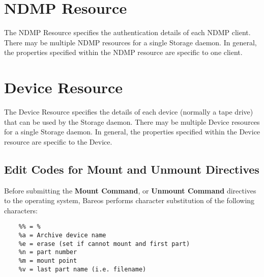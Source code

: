 \section{NDMP Resource}
\label{NDMPResource}
\label{StorageResourceNDMP}

The NDMP Resource specifies the authentication details of each NDMP client.
There may be multiple NDMP resources for a single Storage daemon. In general,
the properties specified within the NDMP resource are specific to one client.







\section{Device Resource}
\label{StorageResourceDevice}

The Device Resource specifies the details of each device (normally a tape
drive) that can be used by the Storage daemon.  There may be multiple
Device resources for a single Storage daemon.  In general, the properties
specified within the Device resource are specific to the Device.






\subsection{Edit Codes for Mount and Unmount Directives}
\label{mountcodes}

Before submitting the {\bf Mount Command}, or {\bf Unmount Command}
directives to the operating system, Bareos performs character substitution
of the following characters:

\footnotesize
\begin{verbatim}
    %% = %
    %a = Archive device name
    %e = erase (set if cannot mount and first part)
    %n = part number
    %m = mount point
    %v = last part name (i.e. filename)
\end{verbatim}
\normalsize

